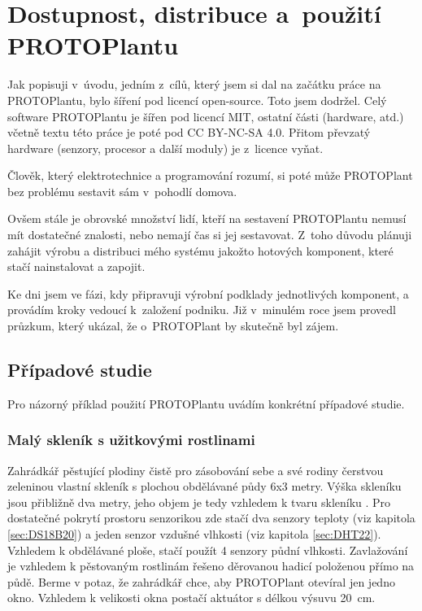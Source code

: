 \chapter{Dostupnost, distribuce a~použití PROTOPlantu}
Jak popisuji v~úvodu, jedním z~cílů, který jsem si dal na začátku práce na PROTOPlantu, bylo šíření pod licencí open-source.
Toto jsem dodržel. 
Celý software PROTOPlantu je šířen pod licencí MIT, ostatní části (hardware, atd.) včetně textu této práce je poté pod CC BY-NC-SA 4.0.
Přitom převzatý hardware (senzory, procesor a další moduly) je z~licence vyňat.

Člověk, který elektrotechnice a programování rozumí, si poté může PROTOPlant bez problému sestavit sám v~pohodlí domova.

Ovšem stále je obrovské množství lidí, kteří na sestavení PROTOPlantu nemusí mít dostatečné znalosti, nebo nemají čas si jej sestavovat.
Z~toho důvodu plánuji zahájit výrobu a distribuci mého systému jakožto hotových komponent, které stačí nainstalovat a zapojit.

Ke dni  jsem ve fázi, kdy připravuji výrobní podklady jednotlivých komponent, a provádím kroky vedoucí k~založení podniku.
Již v~minulém roce jsem provedl průzkum, který ukázal, že o~PROTOPlant by skutečně byl zájem.

\section{Případové studie}
Pro názorný příklad použití PROTOPlantu uvádím konkrétní případové studie.

\subsection{Malý skleník s užitkovými rostlinami}
Zahrádkář pěstující plodiny čistě pro zásobování sebe a své rodiny čerstvou zeleninou vlastní skleník s plochou obdělávané půdy 6x3 metry.
Výška skleníku jsou přibližně dva metry, jeho objem je tedy vzhledem k tvaru skleníku .
Pro dostatečné pokrytí prostoru senzorikou zde stačí dva senzory teploty (viz kapitola \ref{sec:DS18B20}) a jeden senzor vzdušné vlhkosti (viz kapitola \ref{sec:DHT22}). 
Vzhledem k obdělávané ploše, stačí použít 4 senzory půdní vlhkosti.
Zavlažování je vzhledem k pěstovaným rostlinám řešeno děrovanou hadicí položenou přímo na půdě.
Berme v potaz, že zahrádkář chce, aby PROTOPlant otevíral jen jedno okno.
Vzhledem k velikosti okna postačí aktuátor s délkou výsuvu 20~cm.

